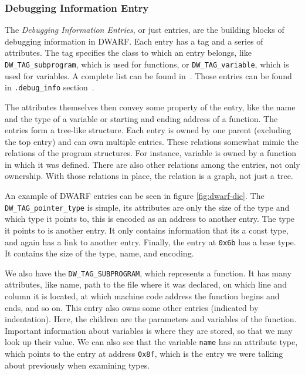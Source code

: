 \subsubsection{Debugging Information Entry}
The \textit{Debugging Information Entries}, or just entries, are the building
blocks of debugging information in DWARF. Each entry has a tag and a series of
attributes. The tag specifies the class to which an entry belongs, like
\verb|DW_TAG_subprogram|, which is used for functions, or
\verb|DW_TAG_variable|, which is used for variables. A complete list can be
found in~\cite{dwarf}. Those entries can be found in \verb|.debug_info|
section~\cite{dwarf}. 

The attributes themselves then convey some property of the entry, like the name
and the type of a variable or starting and ending address of a function. The
entries form a tree-like structure. Each entry is owned by one parent
(excluding the top entry) and can own multiple entries. These relations
somewhat mimic the relations of the program structures. For instance, variable
is owned by a function in which it was defined. There are also other relations
among the entries, not only ownership. With those relations in place, the
relation is a graph, not just a tree.

An example of DWARF entries can be seen in figure \ref{fig:dwarf-die}. The
\verb|DW_TAG_pointer_type| is simple, its attributes are only the size of
the type and which type it points to, this is encoded as an address to another
entry. The type it points to is another entry. It only contains information that
its a const type, and again has a link to another entry. Finally, the entry at
\texttt{0x6b} has a base type. It contains the size of the type, name, and
encoding. 

We also have the \texttt{DW\_TAG\_SUBPROGRAM}, which represents a function. It
has many attributes, like name, path to the file where it was declared, on
which line and column it is located, at which machine code address the function
begins and ends, and so on. This entry also owns some other entries (indicated
by indentation). Here, the children are the parameters and variables of the
function. Important information about variables is where they are stored, so
that we may look up their value. We can also see that the variable
\texttt{name} has an attribute type, which points to the entry at address
\texttt{0x8f}, which is the entry we were talking about previously when
examining types.


